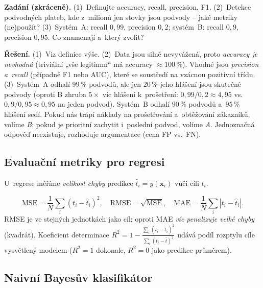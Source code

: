 \begin{priklad}
\par
\textbf{Zadání (zkráceně).} (1)~Definujte accuracy, recall, precision, F1. (2)~Detekce podvodných plateb, kde z~milionů jen stovky jsou podvody -- jaké metriky (ne)použít? (3)~Systém~A: recall $0{,}99$, precision $0{,}2$; systém~B: recall $0{,}9$, precision $0{,}95$. Co znamenají a~který zvolit?

\smallskip
\textbf{Řešení.} (1)~Viz definice výše. (2)~Data jsou silně nevyvážená, proto \emph{accuracy je nevhodná} (triviální „vše legitimní`` má accuracy $\approx 100\,\%$). Vhodné jsou \emph{precision a~recall} (případně F1 nebo AUC), které se soustředí na vzácnou pozitivní třídu. (3)~Systém~A odhalí $99\,\%$ podvodů, ale jen $20\,\%$ jeho hlášení jsou skutečné podvody (oproti B zhruba $5\times$ víc hlášení k~prošetření: $0{,}99/0{,}2\approx 4{,}95$ vs.\ $0{,}9/0{,}95\approx 0{,}95$ na jeden podvod). Systém~B odhalí $90\,\%$ podvodů a~$95\,\%$ hlášení sedí. Pokud nás trápí náklady na prošetřování a~obtěžování zákazníků, volíme \emph{B}; pokud je prioritní zachytit i~poslední podvod, volíme \emph{A}. Jednoznačná odpověď neexistuje, rozhoduje argumentace (cena FP vs.\ FN).
\end{priklad}

\subsection{Evaluační metriky pro regresi}

U~regrese měříme \emph{velikost chyby} predikce $\hat{t}_i=y(\mathbf{x}_i)$ vůči cíli $t_i$.

\begin{definice}
\[ \mathrm{MSE}=\frac1N\sum_i (t_i-\hat t_i)^2,\quad \mathrm{RMSE}=\sqrt{\mathrm{MSE}},\quad \mathrm{MAE}=\frac1N\sum_i |t_i-\hat t_i|. \]
RMSE je ve stejných jednotkách jako cíl; oproti MAE \emph{víc penalizuje velké chyby} (kvadrát). Koeficient determinace $R^2=1-\frac{\sum_i (t_i-\hat t_i)^2}{\sum_i (t_i-\bar t)^2}$ udává podíl rozptylu cíle vysvětlený modelem ($R^2=1$ dokonale, $R^2=0$ jako predikce průměrem).
\end{definice}

\subsection{Naivní Bayesův klasifikátor}

